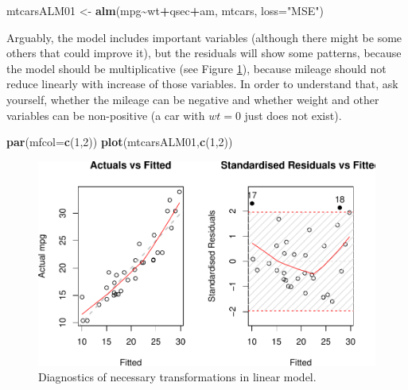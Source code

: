 \documentclass[
]{book}
\newenvironment{Shaded}{\begin{snugshade}}{\end{snugshade}}
\newcommand{\AttributeTok}[1]{\textcolor[rgb]{0.13,0.29,0.53}{#1}}
\newcommand{\DecValTok}[1]{\textcolor[rgb]{0.00,0.00,0.81}{#1}}
\newcommand{\FunctionTok}[1]{\textcolor[rgb]{0.13,0.29,0.53}{\textbf{#1}}}
\newcommand{\NormalTok}[1]{#1}
\newcommand{\OtherTok}[1]{\textcolor[rgb]{0.56,0.35,0.01}{#1}}
\newcommand{\SpecialCharTok}[1]{\textcolor[rgb]{0.81,0.36,0.00}{\textbf{#1}}}
\newcommand{\StringTok}[1]{\textcolor[rgb]{0.31,0.60,0.02}{#1}}
\theoremstyle{definition}
\theoremstyle{definition}
\theoremstyle{definition}
\theoremstyle{definition}
\theoremstyle{remark}
\begin{document}
\begin{Shaded}
\begin{Highlighting}[]
\NormalTok{mtcarsALM01 }\OtherTok{\textless{}{-}} \FunctionTok{alm}\NormalTok{(mpg}\SpecialCharTok{\textasciitilde{}}\NormalTok{wt}\SpecialCharTok{+}\NormalTok{qsec}\SpecialCharTok{+}\NormalTok{am, mtcars, }\AttributeTok{loss=}\StringTok{"MSE"}\NormalTok{)}
\end{Highlighting}
\end{Shaded}

Arguably, the model includes important variables (although there might be some others that could improve it), but the residuals will show some patterns, because the model should be multiplicative (see Figure \ref{fig:diagnostics03}), because mileage should not reduce linearly with increase of those variables. In order to understand that, ask yourself, whether the mileage can be negative and whether weight and other variables can be non-positive (a car with \(wt=0\) just does not exist).

\begin{Shaded}
\begin{Highlighting}[]
\FunctionTok{par}\NormalTok{(}\AttributeTok{mfcol=}\FunctionTok{c}\NormalTok{(}\DecValTok{1}\NormalTok{,}\DecValTok{2}\NormalTok{))}
\FunctionTok{plot}\NormalTok{(mtcarsALM01,}\FunctionTok{c}\NormalTok{(}\DecValTok{1}\NormalTok{,}\DecValTok{2}\NormalTok{))}
\end{Highlighting}
\end{Shaded}

\begin{figure}
\centering
\includegraphics{Svetunkov---Statistics-for-Business-Analytics_files/figure-latex/diagnostics03-1.pdf}
\caption{\label{fig:diagnostics03}Diagnostics of necessary transformations in linear model.}
\end{figure}
\end{document}
